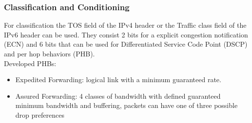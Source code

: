 \subsubsection*{Classification and Conditioning}
For classification the TOS field of the IPv4 header or the Traffic class field of the IPv6 header can be used.
They consist 2 bits for a explicit congestion notification (ECN) and 6 bits that can be used for Differentiated Service Code Point (DSCP) and per hop behaviors (PHB).\\
Developed PHBs:
\begin{itemize}
  \item Expedited Forwarding: logical link with a minimum guaranteed rate.
  \item Assured Forwarding: 4 classes of bandwidth with defined guaranteed minimum bandwidth and buffering, packets can have one of three possible drop preferences
\end{itemize}

